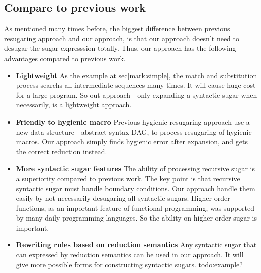 				
\subsection{Compare to previous work}

As mentioned many times before, the biggest difference between previous resugaring approach and our approach, is that our approach doesn't need to desugar the sugar expresssion totally. Thus, our approach has the following advantages compared to previous work.

\begin{itemize}
	\item {\bfseries Lightweight} As the example at sec\ref{mark:simple}, the match and substitution process searchs all intermediate sequences many times. It will cause huge cost for a large program. So out approach---only expanding a syntactic sugar when necessarily, is a lightweight approach.
	\item {\bfseries Friendly to hygienic macro} Previous hygienic resugaring approach use a new data structure---abstract syntax DAG, to process resugaring of hygienic macros. Our approach simply finds hygienic error after expansion, and gets the correct reduction instead.
	\item {\bfseries More syntactic sugar features} The ability of processing recursive sugar is a superiority compared to previous work. The key point is that recursive syntactic sugar must handle boundary conditions. Our approach handle them easily by not necessarily desugaring all syntactic sugars. Higher-order functions, as an important feature of functional programming, was supported by many daily programming languages. So the ability on higher-order sugar is important.
	\item {\bfseries Rewriting rules based on reduction semantics} Any syntactic sugar that can expressed by reduction semantics can be used in our approach. It will give more possible forms for constructing syntactic sugars. todo:example?
\end{itemize}
